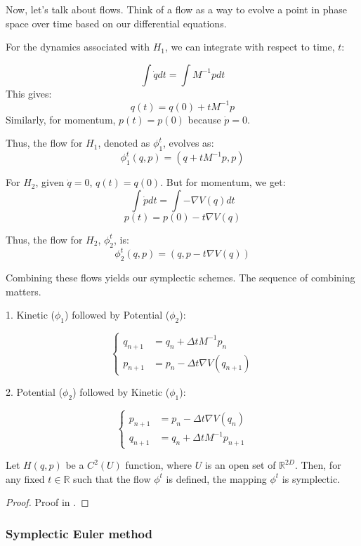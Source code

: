 \documentclass{article}
\begin{document}
Now, let's talk about flows. Think of a flow as a way to evolve a point in phase space over time based on our differential equations.

For the dynamics associated with \(H_1\), we can integrate with respect to time, \( t \):

\[ \int \dot{q} dt = \int M^{-1}p dt \]
This gives:
\[ q(t) = q(0) + tM^{-1}p \]
Similarly, for momentum, \( p(t) = p(0) \) because \(\dot{p}=0\). 

Thus, the flow for \(H_1\), denoted as \(\phi_1^t\), evolves as:
\[ \phi_1^t(q, p) = (q + tM^{-1}p, p) \]

For \(H_2\), given \(\dot{q} = 0\), \( q(t) = q(0) \). But for momentum, we get:
\[ \int \dot{p} dt = \int -\nabla V(q) dt \]
\[ p(t) = p(0) - t\nabla V(q) \]

Thus, the flow for \(H_2\), \(\phi_2^t\), is:
\[ \phi_2^t(q, p) = (q, p - t\nabla V(q)) \]

Combining these flows yields our symplectic schemes. The sequence of combining matters.

1. Kinetic (\(\phi_1\)) followed by Potential (\(\phi_2\)):

\[
	\begin{cases}
		q_{n+1} &= q_n + \Delta t M^{-1} p_n \\
		p_{n+1} &= p_n - \Delta t \nabla V(q_{n+1})
	\end{cases}
\]

2. Potential (\(\phi_2\)) followed by Kinetic (\(\phi_1\)):

\[
	\begin{cases}
		p_{n+1} &= p_n - \Delta t \nabla V(q_n) \\
		q_{n+1} &= q_n + \Delta t M^{-1} p_{n+1}
	\end{cases}
\]

\begin{theorem}
	Let \(H(q,p)\) be a \(C^2(U)\) function, where \(U\) is an open set of \(\mathbb{R}^{2D}\). Then, for any fixed \(t \in \mathbb{R}\) such that the flow \(\phi^t\) is defined, the mapping \(\phi^t\) is symplectic.
\end{theorem}

\begin{proof}
	Proof in \cite[Chapter 2.1.2]{stoltz2023introduction}.
\end{proof}



\subsubsection{Symplectic Euler method}
\label{sec:symplectic_euler_method}
\end{document}

